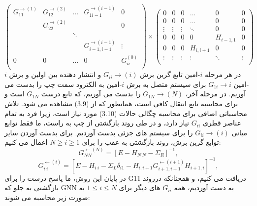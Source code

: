 \begin{equation}
    \left( \begin{matrix}
        G_{11}^{\to (1)} & G_{12}^{\to (2)} & \ldots  & G_{1i-1}^{\to (i-1)} & 0  \\
        {} & G_{22}^{\to (2)} & {} & {} & 0  \\
        {} & {} & \ddots  & {} & {}  \\
        {} & {} & {} & G_{i-1,i-1}^{\to (i-1)} & \vdots   \\
        0 & 0 & \ldots  & 0 & G_{ii}^{(0)}  \\
        \end{matrix} \right)\times \left( \begin{matrix}
        0 & 0 & 0 & \ldots  & 0 & 0  \\
        0 & 0 & 0 & \ldots  & 0 & 0  \\
        \vdots  & \vdots  & \vdots  & \ddots  & 0 & 0  \\
        0 & 0 & 0 & 0 & {{H}_{i-1,1}} & 0  \\
        0 & 0 & 0 & {{H}_{i,i+1}} & 0 & 0  \\
        \vdots  & \vdots  & \vdots  & \vdots  & \ddots  & \vdots   \\
    \end{matrix} \right)
\end{equation}
در هر مرحله $i$-امین تابع گرین برش $G_{ii}\rightarrow(i)$ و انتشار دهنده بین اولین و برش $i$-امین $G_{1i}\rightarrow{i}$ برای سیستم متصل به برش $i$-امین به الکترود سمت چپ را بدست می آوریم. در مرحله آخر، $G_{1N}\rightarrow(N)$ را بدست می آوریم، که تابع درست $G_{1N}$ است و برای محاسبه تابع انتقال کافی است، همانطور که از (3.9) مشاهده می شود.
تلاش محاسباتی اضافی برای محاسبه چگالی حالات (3.10) مورد نیاز است، زیرا فرد به تمام عناصر قطری $G_{ii}$ نیاز دارد، و در طی روند بازگشتی از چپ به راست، ما فقط توابع میانی $G_{ii}\rightarrow(i)$ را برای سیستم های جزئی بدست آوردیم. برای بدست آوردن سایر توابع گرین برش، روند بازگشتی به عقب را برای $N ≥ i ≥ 1$ اعمال می کنیم:
\begin{equation}
    G_{NN}^{\leftarrow (N)}={{\left[ E-{{H}_{N\ N}}-{{\Sigma }_{R}} \right]}^{-1}},
\end{equation}
\begin{equation}
    G_{i\ i}^{\leftarrow (i)}={{\left[ E-{{H}_{i\ i}}-{{\Sigma }_{L}}{{\delta }_{i1}}-{{H}_{i,i+1}}G_{i+1,i+1}^{\leftarrow (i+1)}{{H}_{i+1,i}} \right]}^{-1}},
\end{equation}
در پایان این روش، ما پاسخ درست را برای G11 دریافت می کنیم، و همچنانکه درروند بازگشتی به جلو که GNN به دست آوردیم، همه $G_{ii}$ های دیگر برای  $1≤ i ≤ N$ به صورت زیر محاسبه می شوند:
